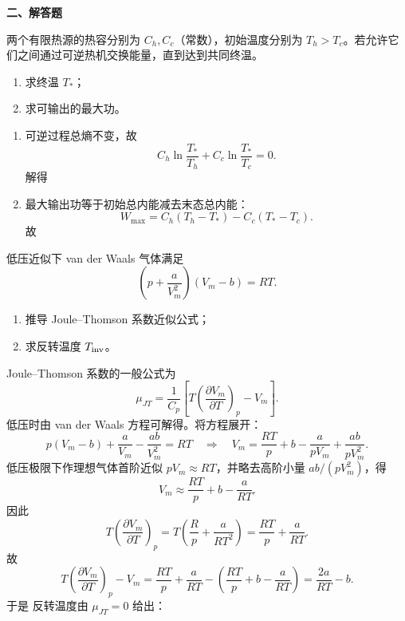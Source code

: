 \textbf{二、解答题}
\begin{question}
两个有限热源的热容分别为 $C_h,C_c$（常数），初始温度分别为 $T_h>T_c$。若允许它们之间通过可逆热机交换能量，直到达到共同终温。
\begin{enumerate}[label=(\arabic*),leftmargin=2.8em,itemsep=0.2em]
\item 求终温 $T_*$；
\item 求可输出的最大功。
\end{enumerate}
\begin{solution}

\begin{enumerate}[label=(\arabic*),leftmargin=2.8em,itemsep=0.2em]
\item 可逆过程总熵不变，故
\[
C_h\ln\frac{T_*}{T_h}+C_c\ln\frac{T_*}{T_c}=0.
\]
解得

\item 最大输出功等于初始总内能减去末态总内能：
\[
W_{\max}=C_h(T_h-T_*)-C_c(T_*-T_c).
\]
故
\end{enumerate}
\end{solution}
\end{question}

\begin{question}
低压近似下 van der Waals 气体满足
\[
\left(p+\frac{a}{V_m^2}\right)(V_m-b)=RT.
\]
\begin{enumerate}[label=(\arabic*),leftmargin=2.8em,itemsep=0.2em]
\item 推导 Joule--Thomson 系数近似公式；
\item 求反转温度 $T_{\rm inv}$。
\end{enumerate}
\begin{solution}

Joule--Thomson 系数的一般公式为
\[
\mu_{JT}=\frac{1}{C_p}\left[T\left(\frac{\partial V_m}{\partial T}\right)_p-V_m\right].
\]
低压时由 van der Waals 方程可解得。将方程展开：
\[
p(V_m-b)+\frac{a}{V_m}-\frac{ab}{V_m^2}=RT
\quad\Longrightarrow\quad
V_m=\frac{RT}{p}+b-\frac{a}{pV_m}+\frac{ab}{pV_m^2}.
\]
低压极限下作理想气体首阶近似 $pV_m\approx RT$，并略去高阶小量 $ab/(pV_m^2)$，得
\[
V_m\approx \frac{RT}{p}+b-\frac{a}{RT}.
\]
因此
\[
T\left(\frac{\partial V_m}{\partial T}\right)_p
=T\left(\frac{R}{p}+\frac{a}{RT^2}\right)
=\frac{RT}{p}+\frac{a}{RT}.
\]
故
\[
T\left(\frac{\partial V_m}{\partial T}\right)_p-V_m
=\frac{RT}{p}+\frac{a}{RT}-\left(\frac{RT}{p}+b-\frac{a}{RT}\right)
=\frac{2a}{RT}-b.
\]
于是
反转温度由 $\mu_{JT}=0$ 给出：
\end{solution}
\end{question}

